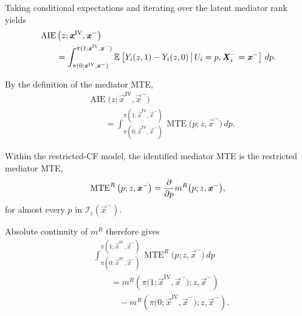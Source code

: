 Taking conditional expectations and iterating over the latent mediator rank yields
\[
    \begin{aligned}
    &\operatorname{AIE}
    \big(
        z;
        \boldsymbol{\mathit{x}}^{\mathrm{IV}},
        \boldsymbol{\mathit{x}}^-
    \big)
    \\
    &\qquad=
    \int_{
        \pi(
            0;
            \boldsymbol{\mathit{x}}^{\mathrm{IV}},
            \boldsymbol{\mathit{x}}^-
        )
    }^{
        \pi(
            1;
            \boldsymbol{\mathit{x}}^{\mathrm{IV}},
            \boldsymbol{\mathit{x}}^-
        )
    }
        \mathbb{E}_{} \left[ 
            Y_i(z,1)-Y_i(z,0)
         \, \middle\vert \, 
            U_i=p,
            \boldsymbol{\mathit{X}}_i^-=\boldsymbol{\mathit{x}}^-
         \right]
    \,dp.
    \end{aligned}
\]

By the definition of the mediator MTE,
\[
    \begin{aligned}
    &\operatorname{AIE}
    \big(
        z;
        \vec x^{\mathrm{IV}},
        \vec x^-
    \big)
    \\
    &\qquad=
    \int_{
        \pi(
            0;
            \vec x^{\mathrm{IV}},
            \vec x^-
        )
    }^{
        \pi(
            1;
            \vec x^{\mathrm{IV}},
            \vec x^-
        )
    }
        \operatorname{MTE}
        \big(
            p;
            z,
            \vec x^-
        \big)
    \,dp.
    \end{aligned}
    \label{eqn:conditional-aie-mte-integral}
\]

Within the restricted-CF model, the identified mediator MTE is the restricted mediator MTE,
\[
    \operatorname{MTE}^R
    \big(
        p;
        z,
        \boldsymbol{\mathit{x}}^-
    \big)
    =
    \frac{\partial}{\partial p}
    m^R
    \big(
        p;
        z,
        \boldsymbol{\mathit{x}}^-
    \big),
\]
for almost every $p$ in $\mathcal I_z(\vec x^-)$.

Absolute continuity of $m^R$ therefore gives
\[
    \begin{aligned}
    &\int_{
        \pi(
            0;
            \vec x^{\mathrm{IV}},
            \vec x^-
        )
    }^{
        \pi(
            1;
            \vec x^{\mathrm{IV}},
            \vec x^-
        )
    }
        \operatorname{MTE}^R
        \big(
            p;
            z,
            \vec x^-
        \big)
    \,dp
    \\
    &\qquad=
    m^R
    \left(
        \pi
        \big(
            1;
            \vec x^{\mathrm{IV}},
            \vec x^-
        \big);
        z,
        \vec x^-
    \right)
    \\
    &\qquad\quad-
    m^R
    \left(
        \pi
        \big(
            0;
            \vec x^{\mathrm{IV}},
            \vec x^-
        \big);
        z,
        \vec x^-
    \right).
    \end{aligned}
    \label{eqn:restricted-aie-equivalence}
\]

